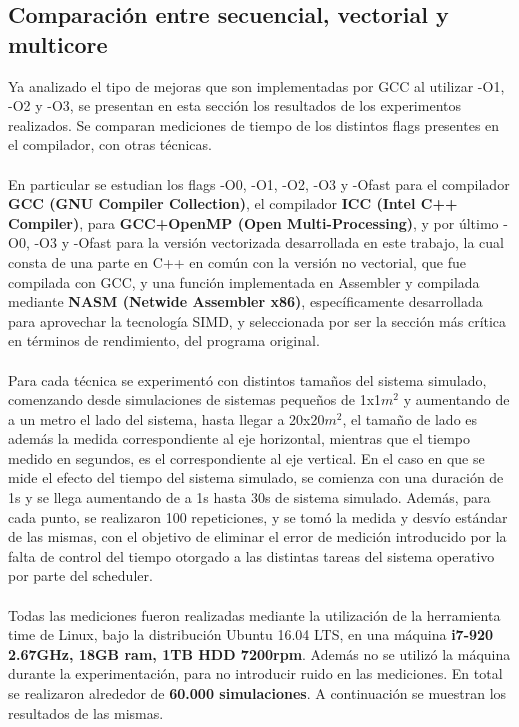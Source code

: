 \subsection{Comparación entre secuencial, vectorial y multicore}
Ya analizado el tipo de mejoras que son implementadas por GCC al utilizar -O1, -O2 y -O3, se presentan en esta sección los resultados de los experimentos realizados. Se comparan mediciones de tiempo de los distintos flags presentes en el compilador, con otras técnicas. 
~\\
~\\
En particular se estudian los flags -O0, -O1, -O2, -O3 y -Ofast para el compilador \textbf{GCC (GNU Compiler Collection)}, el compilador \textbf{ICC (Intel C++ Compiler)}, para \textbf{GCC+OpenMP (Open Multi-Processing)}, y por último -O0, -O3 y -Ofast para la versión vectorizada desarrollada en este trabajo, la cual consta de una parte en C++ en común con la versión no vectorial, que fue compilada con GCC, y una función implementada en Assembler y compilada mediante \textbf{NASM (Netwide Assembler x86)}, específicamente desarrollada para aprovechar la tecnología SIMD, y seleccionada por ser la sección más crítica en términos de rendimiento, del programa original.
~\\
~\\
Para cada técnica se experimentó con distintos tamaños del sistema simulado, comenzando desde simulaciones de sistemas pequeños de 1x1$m^2$ y aumentando de a un metro el lado del sistema, hasta llegar a 20x20$m^2$, el tamaño de lado es además la medida correspondiente al eje horizontal, mientras que el tiempo medido en segundos, es el correspondiente al eje vertical. En el caso en que se mide el efecto del tiempo del sistema simulado, se comienza con una duración de 1s y se llega aumentando de a 1s hasta 30s de sistema simulado. Además, para cada punto, se realizaron 100 repeticiones, y se tomó la medida y desvío estándar de las mismas, con el objetivo de eliminar el error de medición introducido por la falta de control del tiempo otorgado a las distintas tareas del sistema operativo por parte del scheduler. 
~\\
~\\
Todas las mediciones fueron realizadas mediante la utilización de la herramienta time de Linux, bajo la distribución Ubuntu 16.04 LTS, en una máquina \textbf{i7-920 2.67GHz, 18GB ram, 1TB HDD 7200rpm}. Además no se utilizó la máquina durante la experimentación, para no introducir ruido en las mediciones. En total se realizaron alrededor de \textbf{60.000 simulaciones}. A continuación se muestran los resultados de las mismas.
~\\
~\\

